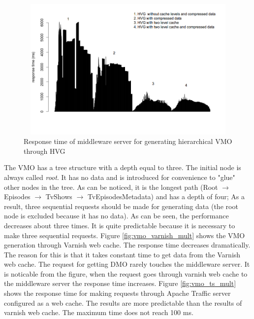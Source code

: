 \begin{figure}[h!]
    \centering
    \includegraphics[width=15cm,height=7cm,keepaspectratio]{images/vmo_hvg.png}
    \caption{Response time of middleware server for generating hierarchical VMO through HVG}
    \label{fig:vmo_hvg}
\end{figure}


The VMO has a tree structure with a depth equal to three. The initial node is always called \textit{root}. It has no data and is introduced for convenience to "glue" other nodes in the tree. As can be noticed, it is the longest path (Root $\rightarrow$ Episodes $\rightarrow$ TvShows $\rightarrow$ TvEpisodesMetadata) and has a depth of four; As a result, three sequential requests should be made for generating data (the root node is excluded because it has no data). As can be seen, the performance decreases about three times. It is quite predictable because it is necessary to make three sequential requests. Figure \ref{fig:vmo_varnish_mult} shows the VMO generation through Varnish web cache. The response time decreases dramatically. The reason for this is that it takes constant time to get data from the Varnish web cache. The request for getting DMO rarely touches the middleware server. It is noticable from the figure, when the request goes through varnish web cache to the middleware server the response time increases. Figure \ref{fig:vmo_ts_mult} shows the response time for making requests through Apache Traffic server configured as a web cache. The results are more predictable than the results of varnish web cache. The maximum time does not reach 100 ms.  

